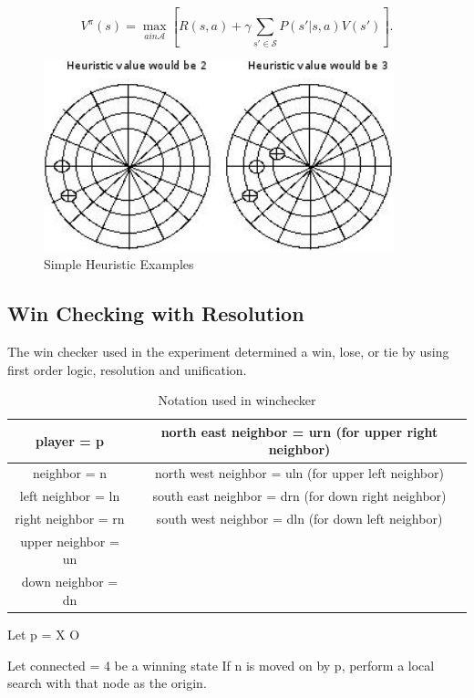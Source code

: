 \documentclass[12pt,letterpaper]{article}
\begin{document}
\[
V^\pi(s)=\max_{a in \mathcal{A}} \left[ R(s,a) + \gamma \sum_{s' \in \mathcal{S}} P(s'|s,a) V(s') \right].
\]

\begin{figure}[h]
\begin{center}
\includegraphics[width=4in]{heu.png}
\end{center}
\caption{Simple Heuristic Examples}
\label{heuristicExample}
\end{figure}

\subsection{Win Checking with Resolution}
The win checker used in the experiment determined a win, lose, or tie by using first order logic, resolution and unification.

\begin{table}[h]
\begin{center}
\begin{tabular}{|c||c|}
\hline
player = p & north east neighbor = urn 
(for upper right neighbor)\\
\hline 
neighbor = n & north west neighbor = uln
(for upper left neighbor)\\
\hline 
left neighbor = ln & south east neighbor = drn
(for down right neighbor)\\
\hline 
right neighbor = rn & south west neighbor = dln
(for down left neighbor)\\
\hline 
upper neighbor = un & \\
\hline 
down neighbor = dn & \\
\hline 
\end{tabular}
\end{center}
\caption{Notation used in winchecker}
\label{Notation}
\end{table}

Let p = X \bigoplus O

Let connected = 4 be a winning state If n is moved on by p, perform a local search with that node as the origin.
\end{document}

